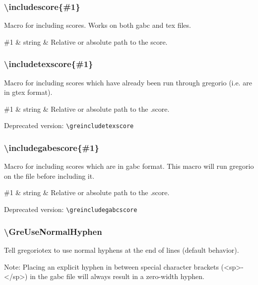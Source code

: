 \subsubsection*{\textbackslash includescore\{\#1\}}
Macro for including scores.  Works on both gabc and tex files.

\begin{argtable}
  \#1 & string & Relative or absolute path to the score.\\
\end{argtable}

\subsubsection*{\textbackslash includetexscore\{\#1\}}
Macro for including scores which have already been run through
gregorio (i.e. are in gtex format).

\begin{argtable}
  \#1 & string & Relative or absolute path to the .\@gtex score.\\
\end{argtable}

\smallskip\hskip 15pt Deprecated version: \verb=\greincludetexscore=

\subsubsection*{\textbackslash includegabescore\{\#1\}}
Macro for including scores which are in gabc format.  This macro will
run gregorio on the file before including it.

\begin{argtable}
  \#1 & string & Relative or absolute path to the .\@gabc score.\\
\end{argtable}

\smallskip\hskip 15pt Deprecated version: \verb=\greincludegabcscore=

\subsubsection*{\textbackslash GreUseNormalHyphen}
Tell gregoriotex to use normal hyphens at the end of lines (default
behavior).

Note: Placing an explicit hyphen in between special character brackets
(\ie <sp>-</sp>) in the gabc file will always result in a zero-width
hyphen.

